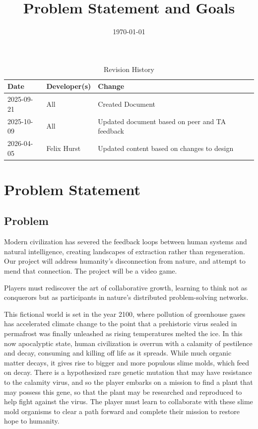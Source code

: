 \documentclass{article}
\title{Problem Statement and Goals\\\progname}
\author{\authname}
\date{\today}
\begin{document}
\maketitle

\begin{table}[hp]
\caption{Revision History} \label{TblRevisionHistory}
\begin{tabularx}{\textwidth}{llX}
\toprule
\textbf{Date} & \textbf{Developer(s)} & \textbf{Change}\\
\midrule
2025-09-21 & All & Created Document\\
2025-10-09 & All & Updated document based on peer and TA feedback\\
2026-04-05 & Felix Hurst & Updated content based on changes to design\\
\bottomrule
\end{tabularx}
\end{table}

\section{Problem Statement}

\subsection{Problem}

Modern civilization has severed the feedback loops between human systems and natural 
intelligence, creating landscapes of extraction rather than regeneration. Our project 
will address humanity's disconnection from nature, and attempt to mend that connection. 
The project will be a video game.

Players must rediscover the art of collaborative growth, learning to think not as 
conquerors but as participants in nature's distributed problem-solving networks. 

This fictional world is set in the year 2100, where pollution of greenhouse gases 
has accelerated climate change to the point that a prehistoric virus sealed in 
permafrost was finally unleashed as rising temperatures melted the ice. In this 
now apocalyptic state, human civilization is overrun with a calamity of pestilence
and decay, consuming and killing off life as it spreads. While much organic matter 
decays, it gives rise to bigger and more populous slime molds, which feed on decay.
There is a hypothesized rare genetic mutation that may have resistance to the 
calamity virus, and so the player embarks on a mission to find a plant that may 
possess this gene, so that the plant may be researched and reproduced to help fight 
against the virus. The player must learn to collaborate with these slime mold 
organisms to clear a path forward and complete their mission to restore hope to humanity.
\end{document}
